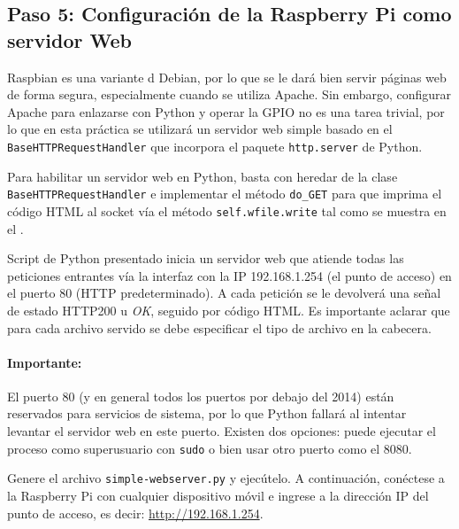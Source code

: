 %
%


\subsection{Paso 5: Configuración de la Raspberry Pi como servidor Web}%
\label{sec:webserver}

Raspbian es una variante d Debian, por lo que se le dará bien servir páginas web de forma segura, especialmente cuando se utiliza Apache.
Sin embargo, configurar Apache para enlazarse con Python y operar la GPIO no es una tarea trivial, por lo que en esta práctica se utilizará un servidor web simple basado en el \texttt{BaseHTTPRequestHandler} que incorpora el paquete \texttt{http.server} de Python.

Para habilitar un servidor web en Python, basta con heredar de la clase \texttt{BaseHTTPRequestHandler} e implementar el método \texttt{do\_GET} para que imprima el código HTML al socket vía el método \texttt{self.wfile.write} tal como se muestra en el .



Script de Python presentado inicia un servidor web que atiende todas las peticiones entrantes vía la interfaz con la IP 192.168.1.254 (el punto de acceso) en el puerto 80 (HTTP predeterminado).
A cada petición se le devolverá una señal de estado HTTP200 u \emph{OK}, seguido por código HTML. %
Es importante aclarar que para cada archivo servido se debe especificar el tipo de archivo en la cabecera.

\paragraph*{Importante:} El puerto 80 (y en general todos los puertos por debajo del 2014) están reservados para servicios de sistema, por lo que Python fallará al intentar levantar el servidor web en este puerto. Existen dos opciones: puede ejecutar el proceso como superusuario con \texttt{sudo} o bien usar otro puerto como el 8080.

Genere el archivo \texttt{simple-webserver.py} y ejecútelo.
A continuación, conéctese a la Raspberry Pi con cualquier dispositivo móvil e ingrese a la dirección IP del punto de acceso, es decir: \url{http://192.168.1.254}.

